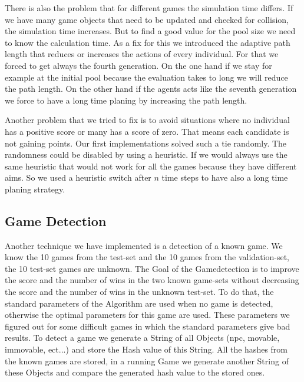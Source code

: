 There is also the problem that for different games the simulation time differs. If we have many game objects that 
need to be updated and checked for collision, the simulation time increases.
But to find a good value for the pool size we need to know the calculation time.
As a fix for this we introduced the adaptive path length that reduces or increases the actions
of every individual.
For that we forced to get always the fourth generation. On the one hand if we stay for example at the initial
pool because the evaluation takes to long we will reduce the path length. On the other hand if the agents acts like 
the seventh generation we force to have a long time planing by increasing the path length.

Another problem that we tried to fix is to avoid situations where no individual has a positive score or many has a score of zero. That means each 
candidate is not gaining points. Our first implementations solved such a tie randomly. 
The randomness could be disabled by using a heuristic. If we would always use the same heuristic that would not work
for all the games because they have different aims. 
So we used a heuristic switch after $n$ time steps to have also a long time planing strategy.


  
  
\subsection{Game Detection} 
  
Another technique we have implemented is a detection of a known game. We know the 10 games from the test-set and the 10 games from the validation-set, the 10 test-set games are unknown. The Goal of the Gamedetection is to improve the score and the number of wins in the two known game-sets without decreasing the score and the number of wins in the unknown test-set. To do that, the standard parameters of the Algorithm are used when no game is detected, otherwise the optimal parameters for this game are used. These parameters we figured out for some difficult games in which the standard parameters give bad results. To detect a game we generate a String of all Objects (npc, movable, immovable, ect...) and store the Hash value of this String. All the hashes from the known games are stored, in a running Game we generate another String of these Objects and compare the generated hash value to the stored ones. 